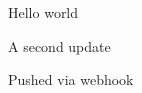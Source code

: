 \documentclass{article}
\begin{document}
Hello world

A second update

Pushed via webhook
\end{document}
